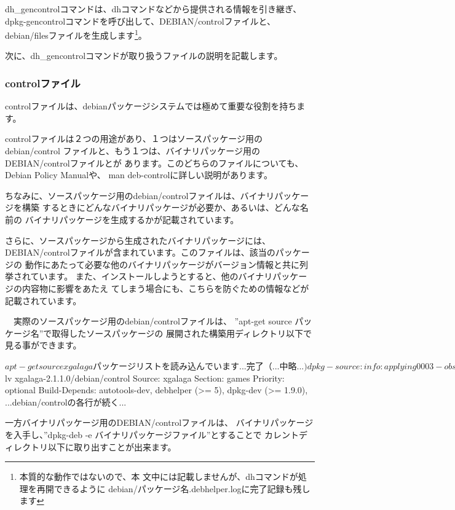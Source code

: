 \documentclass[mingoth,a4paper]{jsarticle}
\begin{document}
 dh\_gencontrolコマンドは、dhコマンドなどから提供される情報を引き継ぎ、
dpkg-gencontrolコマンドを呼び出して、DEBIAN/controlファイルと、
debian/filesファイルを生成します\footnote{本質的な動作ではないので、本
文中には記載しませんが、dhコマンドが処理を再開できるように
debian/パッケージ名.debhelper.logに完了記録も残します}。

 次に、dh\_gencontrolコマンドが取り扱うファイルの説明を記載します。

\subsubsection{controlファイル}

 controlファイルは、debianパッケージシステムでは極めて重要な役割を持ちます。

 controlファイルは２つの用途があり、１つはソースパッケージ用のdebian/control
ファイルと、もう１つは、バイナリパッケージ用のDEBIAN/controlファイルとが
あります。このどちらのファイルについても、Debian Policy Manual\cite{debpolicy}や、
man deb-controlに詳しい説明があります。
 
 ちなみに、ソースパッケージ用のdebian/controlファイルは、バイナリパッケージを構築
するときにどんなバイナリパッケージが必要か、あるいは、どんな名前の
バイナリパッケージを生成するかが記載されています。

 さらに、ソースパッケージから生成されたバイナリパッケージには、
DEBIAN/controlファイルが含まれています。このファイルは、該当のパッケージの
動作にあたって必要な他のバイナリパッケージがバージョン情報と共に列挙されています。
また、インストールしようとすると、他のバイナリパッケージの内容物に影響をあたえ
てしまう場合にも、こちらを防ぐための情報などが記載されています。

　実際のソースパッケージ用のdebian/controlファイルは、
''apt-get source パッケージ名''で取得したソースパッケージの
展開された構築用ディレクトリ以下で見る事ができます。

\begin{commandline}
$ apt-get source xgalaga
パッケージリストを読み込んでいます... 完了
（...中略...)
dpkg-source: info: applying 0003-obsolete-xf86dga.patch
$ lv xgalaga-2.1.1.0/debian/control
Source: xgalaga
Section: games
Priority: optional
Build-Depends: autotools-dev,
               debhelper (>= 5),
               dpkg-dev (>= 1.9.0),
...debian/controlの各行が続く...
\end{commandline}

 一方バイナリパッケージ用のDEBIAN/controlファイルは、
バイナリパッケージを入手し、''dpkg-deb -e バイナリパッケージファイル''とすることで
カレントディレクトリ以下に取り出すことが出来ます。
\end{document}

